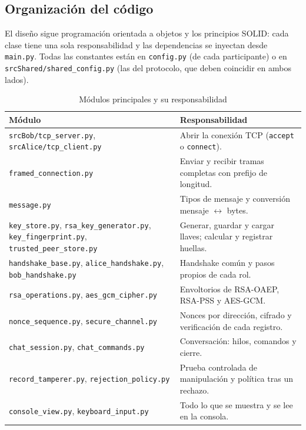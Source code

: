 \documentclass[11pt,a4paper]{article}
\theoremstyle{definition}
\theoremstyle{remark}
\newcommand{\code}[1]{\texttt{#1}}
\begin{document}
\subsection{Organización del código}
\label{subsec:codigo}

El diseño sigue programación orientada a objetos y los principios SOLID:
cada clase tiene una sola responsabilidad y las dependencias se inyectan
desde \code{main.py}. Todas las constantes están en \code{config.py} (de
cada participante) o en \code{srcShared/shared\_config.py} (las del
protocolo, que deben coincidir en ambos lados).

\begin{table}[H]
  \centering
  \caption{Módulos principales y su responsabilidad}
  \label{tab:modulos}
  \small
  \begin{tabularx}{\linewidth}{@{}P{4.6cm} Y@{}}
    \toprule
    \textbf{Módulo} & \textbf{Responsabilidad} \\
    \midrule
    \code{srcBob/tcp\_server.py}, \code{srcAlice/tcp\_client.py} & Abrir la conexión TCP (\code{accept} o \code{connect}). \\
    \code{framed\_connection.py}   & Enviar y recibir tramas completas con prefijo de longitud. \\
    \code{message.py}              & Tipos de mensaje y conversión mensaje $\leftrightarrow$ bytes. \\
    \code{key\_store.py}, \code{rsa\_key\_generator.py}, \code{key\_fingerprint.py}, \code{trusted\_peer\_store.py} & Generar, guardar y cargar llaves; calcular y registrar huellas. \\
    \code{handshake\_base.py}, \code{alice\_handshake.py}, \code{bob\_handshake.py} & Handshake común y pasos propios de cada rol. \\
    \code{rsa\_operations.py}, \code{aes\_gcm\_cipher.py} & Envoltorios de RSA-OAEP, RSA-PSS y AES-GCM. \\
    \code{nonce\_sequence.py}, \code{secure\_channel.py} & Nonces por dirección, cifrado y verificación de cada registro. \\
    \code{chat\_session.py}, \code{chat\_commands.py} & Conversación: hilos, comandos y cierre. \\
    \code{record\_tamperer.py}, \code{rejection\_policy.py} & Prueba controlada de manipulación y política tras un rechazo. \\
    \code{console\_view.py}, \code{keyboard\_input.py} & Todo lo que se muestra y se lee en la consola. \\
    \bottomrule
  \end{tabularx}
\end{table}
\end{document}
